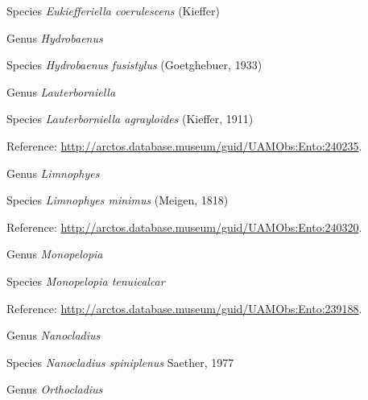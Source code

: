 \documentclass[9pt, article]{memoir}
\begin{document}
\begin{multicols}{2}
\vspace{6pt}\noindent\hspace{36pt}Species \textit{Eukiefferiella coerulescens} (Kieffer)


\vspace{6pt}\noindent\hspace{30pt}Genus \textit{Hydrobaenus}


\vspace{6pt}\noindent\hspace{36pt}Species \textit{Hydrobaenus fusistylus} (Goetghebuer, 1933)


\vspace{6pt}\noindent\hspace{30pt}Genus \textit{Lauterborniella}


\vspace{6pt}\noindent\hspace{36pt}Species \textit{Lauterborniella agrayloides} (Kieffer, 1911)


Reference: 
\url{http://arctos.database.museum/guid/UAMObs:Ento:240235}.

\vspace{6pt}\noindent\hspace{30pt}Genus \textit{Limnophyes}


\vspace{6pt}\noindent\hspace{36pt}Species \textit{Limnophyes minimus} (Meigen, 1818)


Reference: 
\url{http://arctos.database.museum/guid/UAMObs:Ento:240320}.

\vspace{6pt}\noindent\hspace{30pt}Genus \textit{Monopelopia}


\vspace{6pt}\noindent\hspace{36pt}Species \textit{Monopelopia tenuicalcar}


Reference: 
\url{http://arctos.database.museum/guid/UAMObs:Ento:239188}.

\vspace{6pt}\noindent\hspace{30pt}Genus \textit{Nanocladius}


\vspace{6pt}\noindent\hspace{36pt}Species \textit{Nanocladius spiniplenus} Saether, 1977


\vspace{6pt}\noindent\hspace{30pt}Genus \textit{Orthocladius}



\end{multicols}
\end{document}
